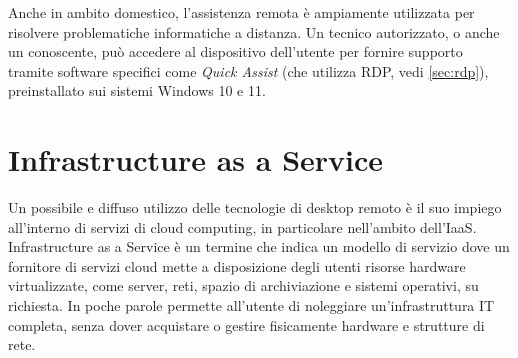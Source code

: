 \documentclass[12pt,a4paper,openright,twoside]{book}
\begin{document}
Anche in ambito domestico, l'assistenza remota è ampiamente utilizzata per risolvere problematiche informatiche a distanza. Un tecnico autorizzato, o anche un conoscente, può accedere al dispositivo dell’utente per fornire supporto tramite software specifici come \textit{Quick Assist} (che utilizza RDP, vedi \ref{sec:rdp}), preinstallato sui sistemi Windows 10 e 11.



\section{Infrastructure as a Service}
\label{sec:iaas}
Un possibile e diffuso utilizzo delle tecnologie di desktop remoto è il suo impiego all'interno di servizi di cloud computing, in particolare nell'ambito dell'\ac{IaaS}.
Infrastructure as a Service è un termine che indica un modello di servizio dove un fornitore di servizi cloud mette a disposizione degli utenti risorse hardware virtualizzate, come server, reti, spazio di archiviazione e sistemi operativi, su richiesta. In poche parole permette all'utente di noleggiare un'infrastruttura IT completa, senza dover acquistare o gestire fisicamente hardware e strutture di rete.
\end{document}
